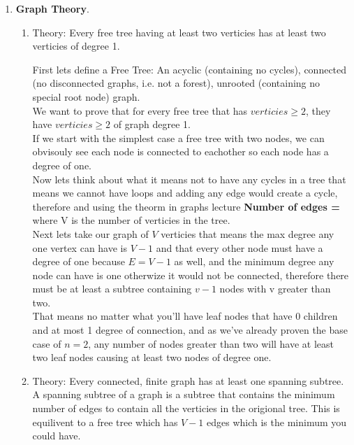 \documentclass{article}
\begin{document}
\begin{enumerate}
    \item \textbf{Graph Theory}.
    \begin{enumerate}
      \item Theory: Every free tree having at least two verticies has at least two verticies of degree 1.
      
      First lets define a Free Tree: An acyclic (containing no cycles), connected (no disconnected graphs, i.e. not a forest), unrooted (containing no special root node) graph.\\ 
      
      We want to prove that for every free tree that has $ verticies \geq 2$, they have $ verticies \geq 2$ of graph degree 1.\\

      If we start with the simplest case a free tree with two nodes, we can obvisouly see each node is connected to eachother so each node has a degree of one.\\

      Now lets think about what it means not to have any cycles in a tree that means we cannot have loops and adding any edge would create a cycle, therefore and using the theorm in graphs lecture \textbf{Number of edges = } where V is the number of verticies in the tree.\\

      Next lets take our graph of $V$ verticies that means the max degree any one vertex can have is $V - 1$ and that every other node must have a degree of one because $E = V - 1$ as well, and the minimum degree any node can have is one otherwize it would not be connected, therefore there must be at least a subtree containing $v - 1$ nodes with v greater than two.\\ 

      That means no matter what you'll have leaf nodes that have 0 children and at most 1 degree of connection, and as we've already proven the base case of $n = 2$, any number of nodes greater than two will have at least two leaf nodes causing at least two nodes of degree one.

      \item Theory: Every connected, finite graph has at least one spanning subtree.\\
      
      A spanning subtree of a graph is a subtree that contains the minimum number of edges to contain all the verticies in the origional tree. This is equilivent to a free tree which has $V - 1$ edges which is the minimum you could have. \\
      

\end{enumerate}
\end{enumerate}
\end{document}
